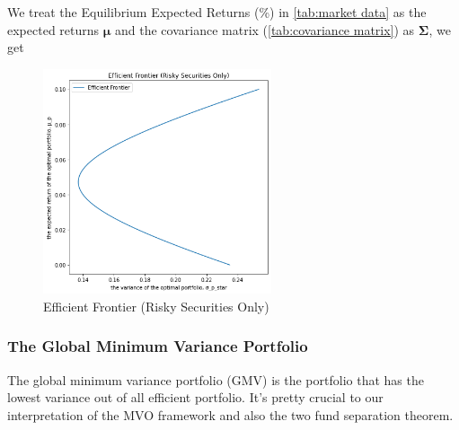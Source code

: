 \documentclass[13pt]{article}
\theoremstyle{definition}
\theoremstyle{remark}
\begin{document}
We treat the Equilibrium
Expected Returns (\%) in \cref{tab:market data} as the expected returns $\bm{\mu}$ and the covariance matrix (\cref{tab:covariance matrix}) as $\mathbf{\Sigma}$, we get
\begin{figure}[!htp]
    \centering
    \includegraphics[width=0.6\textwidth]{Efficient Frontier Risky Only.png}
    \caption{Efficient Frontier (Risky Securities Only)}
    \label{fig:Efficient Frontier Risky Only}
\end{figure}
\subsubsection{The Global Minimum Variance Portfolio}
The global minimum variance portfolio (GMV) is the portfolio that has the lowest variance out of all efficient portfolio. It's pretty crucial to our interpretation of the MVO framework and also the two fund separation theorem.
\end{document}
